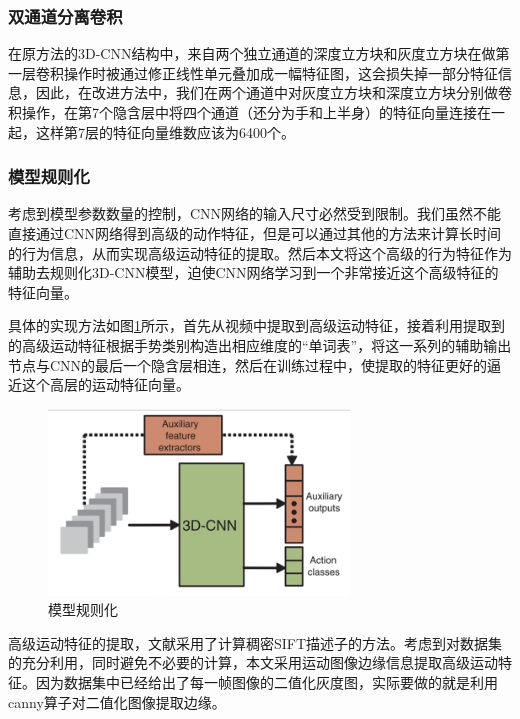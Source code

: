 \documentclass[a4paper, 12pt]{article}
\begin{document}
\subsubsection{双通道分离卷积}
在原方法的3D-CNN结构中，来自两个独立通道的深度立方块和灰度立方块在做第一层卷积操作时被通过修正线性单元叠加成一幅特征图，这会损失掉一部分特征信息，因此，在改进方法中，我们在两个通道中对灰度立方块和深度立方块分别做卷积操作，在第7个隐含层中将四个通道（还分为手和上半身）的特征向量连接在一起，这样第7层的特征向量维数应该为6400个。

\subsubsection{模型规则化}
考虑到模型参数数量的控制，CNN网络的输入尺寸必然受到限制。我们虽然不能直接通过CNN网络得到高级的动作特征，但是可以通过其他的方法来计算长时间的行为信息，从而实现高级运动特征的提取。然后本文将这个高级的行为特征作为辅助去规则化3D-CNN模型，迫使CNN网络学习到一个非常接近这个高级特征的特征向量。

具体的实现方法如图\ref{fig:5}所示，首先从视频中提取到高级运动特征，接着利用提取到的高级运动特征根据手势类别构造出相应维度的“单词表”，将这一系列的辅助输出节点与CNN的最后一个隐含层相连，然后在训练过程中，使提取的特征更好的逼近这个高层的运动特征向量。

\begin{figure}[ht]
  \centering
  \includegraphics[width=8cm]{regular.png}
  \caption{\label{fig:5}模型规则化}
\end{figure}


高级运动特征的提取，文献\cite{p4}采用了计算稠密SIFT描述子的方法。考虑到对数据集的充分利用，同时避免不必要的计算，本文采用运动图像边缘信息提取高级运动特征。因为数据集中已经给出了每一帧图像的二值化灰度图，实际要做的就是利用canny算子对二值化图像提取边缘。
\end{document}
